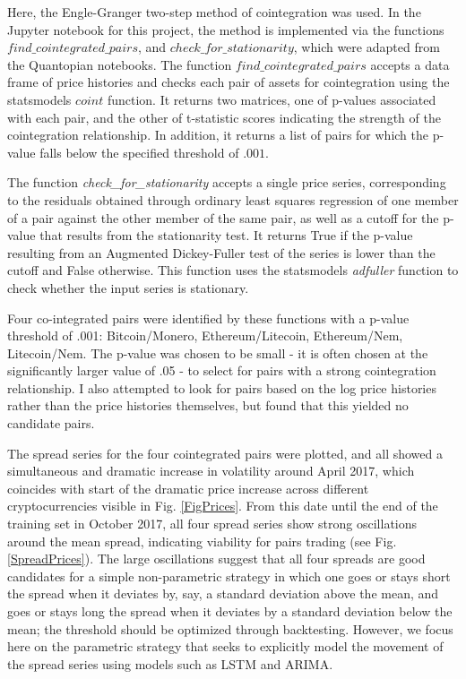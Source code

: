 \documentclass{article}
\begin{document}
Here, the Engle-Granger two-step method of cointegration was used. In the Jupyter notebook for this project, the method is implemented via the functions $find\_cointegrated\_pairs$, and $check\_for\_stationarity$, which were adapted from the Quantopian notebooks. The function $find\_cointegrated\_pairs$ accepts a data frame of price histories and checks each pair of assets for cointegration using the statsmodels $coint$ function. It returns two matrices, one of p-values associated with each pair, and the other of t-statistic scores indicating the strength of the cointegration relationship. In addition, it returns a list of pairs for which the p-value falls below the specified threshold of $.001$.  

The function  \textit{check\_for\_stationarity} accepts a single price series, corresponding to the residuals obtained through ordinary least squares regression of one member of a pair against the other member of the same pair, as well as a cutoff for the p-value that results from the stationarity test. It returns True if the p-value resulting from an Augmented Dickey-Fuller test of the series is lower than the cutoff and False otherwise. This function uses the statsmodels \textit{adfuller} function to check whether the input series is stationary. 

Four co-integrated pairs were identified by these functions with a p-value threshold of .001: Bitcoin/Monero, Ethereum/Litecoin, Ethereum/Nem, Litecoin/Nem. The p-value was chosen to be small - it is often chosen at the significantly larger value of .05 - to select for pairs with a strong cointegration relationship. I also attempted to look for pairs based on the log price histories rather than the price histories themselves, but found that this yielded no candidate pairs. 

The spread series for the four cointegrated pairs were plotted, and all showed a simultaneous and dramatic increase in volatility around April 2017, which coincides with start of the dramatic price increase across different cryptocurrencies visible in Fig. \ref{FigPrices}. From this date until the end of the training set in October 2017, all four spread series show strong oscillations around the mean spread, indicating viability for pairs trading (see Fig. \ref{SpreadPrices}). The large oscillations suggest that all four spreads are good candidates for a simple non-parametric strategy in which one goes or stays short the spread when it deviates by, say, a standard deviation above the mean, and goes or stays long the spread when it deviates by a standard deviation below the mean; the threshold should be optimized through backtesting. However, we focus here on the parametric strategy that seeks to explicitly model the movement of the spread series using models such as LSTM and ARIMA. 
\end{document}
